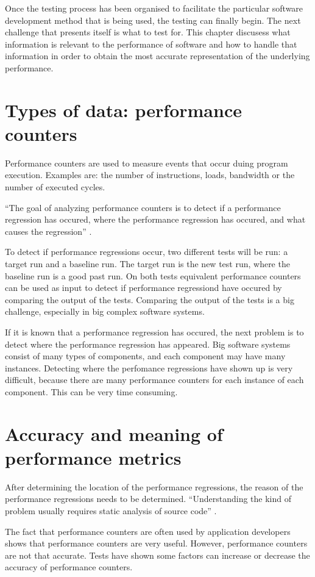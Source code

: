 Once the testing process has been organised to facilitate the particular software development method that is being used, the testing can finally begin. The next challenge that presents itself is what to test for. This chapter discusess what information is relevant to the performance of software and how to handle that information in order to obtain the most accurate representation of the underlying performance.

\section{Types of data: performance counters}
Performance counters are used to measure events that occur duing program execution\cite{PC}. Examples are: the number of instructions, loads, bandwidth or the number of executed cycles.

``The goal of analyzing performance counters is to detect if a performance regression has occured, where the performance regression has occured, and what causes the regression'' \cite{nguyen2012using}.

To detect if performance regressions occur, two different tests will be run: a target run and a baseline run. The target run is the new test run, where the baseline run is a good past run. On both tests equivalent performance counters can be used as input to detect if performance regressiond have occured by comparing the output of the tests. Comparing the output of the tests is a big challenge, especially in big complex software systems.

If it is known that a performance regression has occured, the next problem is to detect where the performance regression has appeared. Big software systems consist of many types of components, and each component may have many instances. Detecting where the perfomance regressions have shown up is very difficult, because there are many performance counters for each instance of each component. This can be very time consuming.

\section{Accuracy and meaning of performance metrics}
After determining the location of the performance regressions, the reason of the performance regressions needs to be determined. ``Understanding the kind of problem usually requires static analysis of source code'' \cite{nguyen2012using}.

The fact that performance counters are often used by application developers shows that performance counters are very useful. However, performance counters are not that accurate. Tests have shown some factors can increase or decrease the accuracy of performance counters.

